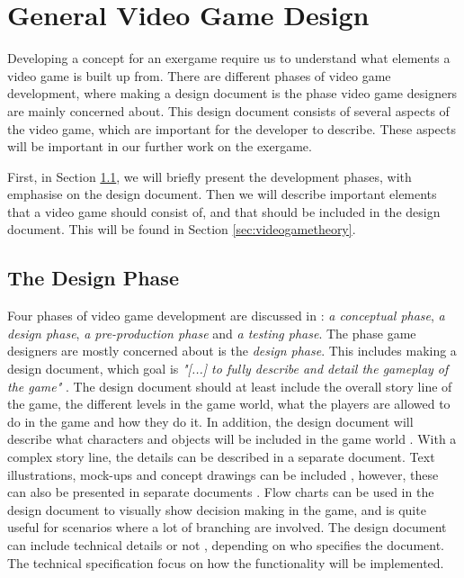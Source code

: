 \chapter{General Video Game Design} 
\label{chap:vg}
Developing a concept for an exergame require us to understand what elements a video game is built up from. There are different phases of video game development, where making a design document is the phase video game designers are mainly concerned about. This design document consists of several aspects of the video game, which are important for the developer to describe. These aspects will be important in our further work on the exergame.

First, in Section \ref{sec:designphase}, we will briefly present the development phases, with emphasise on the design document. Then we will describe important elements that a video game should consist of, and that should be included in the design document.  This will be found in Section \ref{sec:videogametheory}.

\section{The Design Phase}
\label{sec:designphase}
Four phases of video game development are discussed in \cite{understandingvg}: \emph{a conceptual phase}, \emph{a design phase}, \emph{a pre-production phase} and \emph{a testing phase}. The phase game designers are mostly concerned about is the \emph{design phase}. This includes making a design document, which goal is \emph{"[...] to fully describe and detail the gameplay of the game"} \cite{gamedesign}. The design document should at least include the overall story line of the game, the different levels in the game world, what the players are allowed to do in the game and how they do it. In addition, the design document will describe what characters and objects will be included in the game world \cite{gamedesign}. With a complex story line, the details can be described in a separate document. Text illustrations, mock-ups and concept drawings can be included \cite{understandingvg}, however, these can also be presented in separate documents \cite{gamedesign}. Flow charts can be used in the design document to visually show decision making in the game, and is quite useful for scenarios where a lot of branching are involved. The design document can include technical details \cite{understandingvg} or not \cite{gamedesign}, depending on who specifies the document. The technical specification focus on how the functionality will be implemented.

